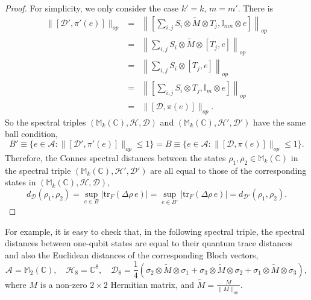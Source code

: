 \documentclass[a4paper,12pt]{article}
\begin{document}
\begin{proof}
	For simplicity, we only consider the case $k' = k$,
$m = m'$. There is
\begin{eqnarray}
  \|[\mathcal{D}', \pi' (e)]\|_{op} & = & \left\| \left[ \sum_{i, j} S_i
  \otimes \tilde{M} \otimes T_j, \mathbb{I}_{mn} \otimes e \right]
  \right\|_{op} \nonumber\\
  & = & \left\| \sum_{i, j} S_i \otimes \tilde{M} \otimes [T_j, e]
  \right\|_{op} \nonumber\\
  & = & \left\| \sum_{i, j} S_i \otimes [T_j, e] \right\|_{op}  \nonumber\\
  & = & \left\| \left[ \sum_{i, j} S_i \otimes T_j, \mathbb{I}_m \otimes e
  \right] \right\|_{op} \nonumber\\
  & = & \|[\mathcal{D}, \pi (e)]\|_{op} . 
\end{eqnarray}
So the spectral triples $(\mathbb{M}_k (\mathbb{C}), \mathcal{H},
\mathcal{D})$ and $(\mathbb{M}_k (\mathbb{C}), \mathcal{H}', \mathcal{D}')$
have the same ball condition,
\begin{equation}
  B' \equiv \{e \in \mathcal{A}: \|[\mathcal{D}', \pi' (e)]\|_{op} \leqslant 1\} =
  B \equiv \{e \in \mathcal{A}: \|[\mathcal{D}, \pi (e)]\|_{op} \leqslant 1\} .
\end{equation}
Therefore, the Connes spectral distances between the states $\rho_1, \rho_2
\in \mathbb{M}_k (\mathbb{C})$ in the spectral triple $(\mathbb{M}_k
(\mathbb{C}), \mathcal{H}', \mathcal{D}')$ are all equal to those of the
corresponding states in $(\mathbb{M}_k (\mathbb{C}), \mathcal{H},
\mathcal{D})$,
\begin{equation}
  d_{\mathcal{D}} (\rho_1, \rho_2) = \sup_{e \in B} | \mathrm{tr}_F (\Delta
  \rho \, e) | = \sup_{e \in B'} | \mathrm{tr}_F (\Delta \rho
  \, e) | = d_{\mathcal{D}'} (\rho_1, \rho_2) .
\end{equation}
\end{proof}

For example, it is easy to check that, in the following spectral triple, the
spectral distances between one-qubit states are equal to their quantum trace distances and also the Euclidean
distances of the corresponding Bloch vectors,
\begin{equation}
  \mathcal{A}=\mathbb{M}_2 (\mathbb{C}), \quad \mathcal{H}_8 =\mathbb{C}^8,
  \quad \mathcal{D}_8 = \frac{1}{4}  (\sigma_2 \otimes \tilde{M} \otimes
  \sigma_1 + \sigma_3 \otimes \tilde{M} \otimes \sigma_2 + \sigma_1 \otimes
  \tilde{M} \otimes \sigma_3),
\end{equation}
where $M$ is a non-zero $2\times 2$ Hermitian matrix, and
$\tilde{M} = \frac{M}{\|M\|_{op}}$.
\end{document}
